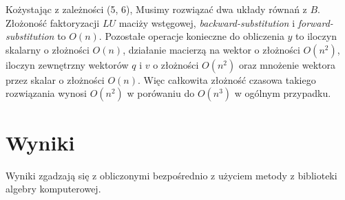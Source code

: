 \documentclass[11pt]{extarticle}
\begin{document}
	Kożystając z zależności (5, 6), Musimy rozwiązać dwa układy równań z \(B\).
	Złożoność faktoryzacji \(LU\) maciży wstęgowej, \textit{backward-substitution} i \textit{forward-substitution} to \(O(n)\).
	Pozostałe operacje konieczne do obliczenia \(y\) to iloczyn skalarny o złożności \(O(n)\),
	działanie macierzą na wektor o złożności \(O(n^2)\),
	iloczyn zewnętrzny wektorów \(q\) i \(v\) o złożności \(O(n^2)\)
	oraz mnożenie wektora przez skalar o złożności \(O(n)\).
	Więc całkowita złożność czasowa takiego rozwiązania wynosi \(O(n^2)\) w porówaniu do \(O(n^3)\) w ogólnym przypadku.

	\section{Wyniki}
	Wyniki zgadzają się z obliczonymi bezpośrednio z użyciem metody z biblioteki algebry komputerowej.
\end{document}
